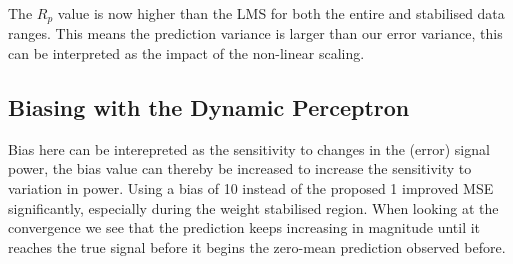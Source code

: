 \documentclass[12pt]{article}
\numberwithin{equation}{section}
\begin{document}
		The $R_p$ value is now higher than the LMS for both the entire and stabilised data ranges. This means the prediction variance is larger than our error variance, this can be interpreted as the impact of the non-linear scaling.
		
	\subsection{Biasing with the Dynamic Perceptron} \label{sec: 4-4-biasing-dynamic-perceptron}
		\begin{minipage}[b]{0.49\textwidth}
			Bias here can be interepreted as the sensitivity to changes in the (error) signal power, the bias value can thereby be increased to increase the sensitivity to variation in power. Using a bias of 10 instead of the proposed 1 improved MSE significantly, especially during the weight stabilised region. When looking at the convergence we see that the prediction keeps increasing in magnitude until it reaches the true signal before it begins the zero-mean prediction observed before.
		\end{minipage}%
		\begin{minipage}{0.04\textwidth}
			\hspace*{0.04\textwidth}
		\end{minipage}%
\end{document}
